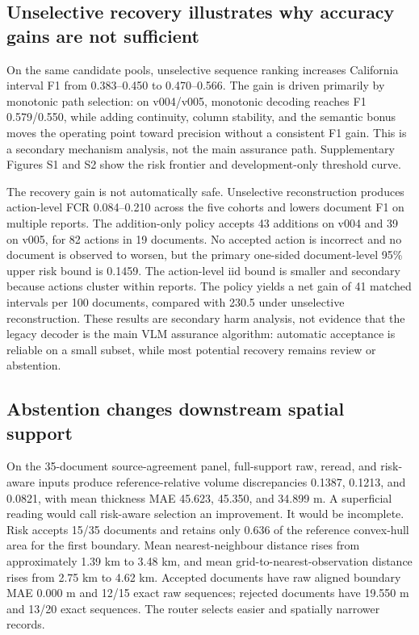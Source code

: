 \documentclass[a4paper,fleqn]{cas-sc}
\begin{document}
\subsection{Unselective recovery illustrates why accuracy gains are not sufficient}

On the same candidate pools, unselective sequence ranking increases California interval F1 from 0.383--0.450 to 0.470--0.566. The gain is driven primarily by monotonic path selection: on v004/v005, monotonic decoding reaches F1 0.579/0.550, while adding continuity, column stability, and the semantic bonus moves the operating point toward precision without a consistent F1 gain. This is a secondary mechanism analysis, not the main assurance path. Supplementary Figures S1 and S2 show the risk frontier and development-only threshold curve.

The recovery gain is not automatically safe. Unselective reconstruction produces action-level FCR 0.084--0.210 across the five cohorts and lowers document F1 on multiple reports. The addition-only policy accepts 43 additions on v004 and 39 on v005, for 82 actions in 19 documents. No accepted action is incorrect and no document is observed to worsen, but the primary one-sided document-level 95\% upper risk bound is 0.1459. The action-level iid bound is smaller and secondary because actions cluster within reports. The policy yields a net gain of 41 matched intervals per 100 documents, compared with 230.5 under unselective reconstruction. These results are secondary harm analysis, not evidence that the legacy decoder is the main VLM assurance algorithm: automatic acceptance is reliable on a small subset, while most potential recovery remains review or abstention.

\subsection{Abstention changes downstream spatial support}

On the 35-document source-agreement panel, full-support raw, reread, and risk-aware inputs produce reference-relative volume discrepancies 0.1387, 0.1213, and 0.0821, with mean thickness MAE 45.623, 45.350, and 34.899 m. A superficial reading would call risk-aware selection an improvement. It would be incomplete. Risk accepts 15/35 documents and retains only 0.636 of the reference convex-hull area for the first boundary. Mean nearest-neighbour distance rises from approximately 1.39 km to 3.48 km, and mean grid-to-nearest-observation distance rises from 2.75 km to 4.62 km. Accepted documents have raw aligned boundary MAE 0.000 m and 12/15 exact raw sequences; rejected documents have 19.550 m and 13/20 exact sequences. The router selects easier and spatially narrower records.
\end{document}
